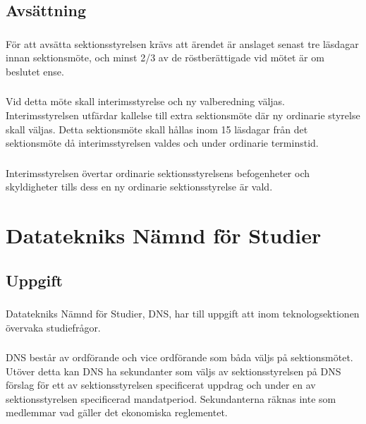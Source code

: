 \documentclass[a4paper]{dtek}
\begin{document}
\subsection{Avsättning}
\subsubsection{}
För att avsätta sektionsstyrelsen krävs att ärendet är anslaget senast tre läsdagar innan sektionsmöte, och minst 2/3 av de röstberättigade vid mötet är om beslutet ense.
\subsubsection{}
Vid detta möte skall interimsstyrelse och ny valberedning väljas. Interimsstyrelsen utfärdar kallelse till extra sektionsmöte där ny ordinarie styrelse skall väljas. Detta sektionsmöte skall hållas inom 15 läsdagar från det sektionsmöte då interimsstyrelsen valdes och under ordinarie terminstid.
\subsubsection{}
Interimsstyrelsen övertar ordinarie sektionsstyrelsens befogenheter och skyldigheter tills dess en ny ordinarie sektionsstyrelse är vald.
\newpage

\section{Datatekniks Nämnd för Studier}
\subsection{Uppgift}
\subsubsection{}
Datatekniks Nämnd för Studier, DNS, har till uppgift att inom teknologsektionen övervaka studiefrågor.
\subsubsection{}
DNS består av ordförande och vice ordförande som båda väljs på sektionsmötet. Utöver detta kan DNS ha sekundanter som väljs av sektionsstyrelsen på DNS förslag för ett av sektionsstyrelsen specificerat uppdrag och under en av sektionsstyrelsen specificerad mandatperiod. Sekundanterna räknas inte som medlemmar vad gäller det ekonomiska reglementet.
\end{document}
